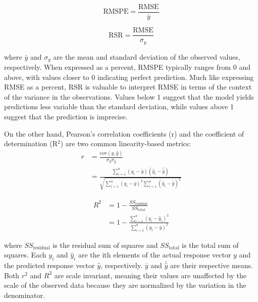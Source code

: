 \begin{equation} \label{eq_rmspe}
    \text{RMSPE} = \frac{\text{RMSE}}{\bar{y}}
\end{equation}

\begin{equation} \label{eq_rsr}
    \text{RSR} = \frac{\text{RMSE}}{\sigma_y}
\end{equation}

where $\bar{y}$ and $\sigma_y$ are the mean and standard deviation of the observed values, respectively. When expressed as a percent, RMSPE typically ranges from 0 and above, with values closer to 0 indicating perfect prediction. Much like expressing RMSE as a percent, RSR is valuable to interpret RMSE in terms of the context of the variance in the observations. Values below 1 suggest that the model yields predictions less variable than the standard deviation, while values above 1 suggest that the prediction is imprecise.

On the other hand, Pearson's correlation coefficients (r) and the coefficient of determination (R$^2$) are two common linearity-based metrics:
\begin{equation} \label{eq_r}
    \begin{aligned}
    r &= \frac{\text{cov}(y, \hat{y})}{\sigma_y \sigma_{\hat{y}}} \\
    &= \frac{\sum_{i=1}^{n} (y_i - \bar{y})(\hat{y}_i - \bar{\hat{y}})}{\sqrt{\sum_{i=1}^{n} (y_i - \bar{y})^2 \sum_{i=1}^{n} (\hat{y}_i - \bar{\hat{y}})^2}}
    \end{aligned}
\end{equation}

\begin{equation} \label{eq_R2}
    \begin{aligned}
    R^2 &= 1 - \frac{SS_{\text{residual}}}{SS_{\text{total}}} \\
    &= 1 - \frac{\sum_{i=1}^{n} (y_i - \hat{y}_i)^2}{\sum_{i=1}^{n} (y_i - \bar{y})^2}
    \end{aligned}
\end{equation}

where \(SS_{\text{residual}}\) is the residual sum of squares and \(SS_{\text{total}}\) is the total sum of squares. Each \(y_i\) and \(\hat{y}_i\) are the ith elements of the actual response vector \(y\) and the predicted response vector \(\hat{y}\), respectively. \(\bar{y}\) and \(\bar{\hat{y}}\) are their respective means. Both \(r^2\) and \(R^2\) are scale invariant, meaning their values are unaffected by the scale of the observed data because they are normalized by the variation in the denominator.

